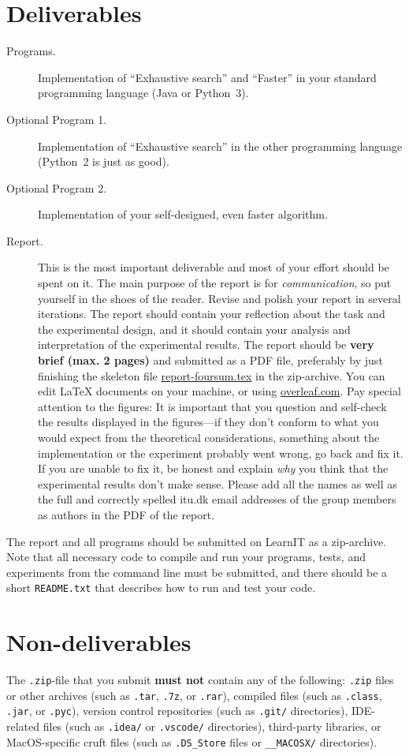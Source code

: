 \documentclass[nobib]{tufte-handout}
\begin{document}
\section{Deliverables}
\begin{description}
  \item[Programs.] Implementation of ``Exhaustive search'' and ``Faster'' in your standard programming language (Java or Python~3).
  \item[Optional Program 1.] Implementation of ``Exhaustive search''  in the other programming language (Python~2 is just as good).
  \item[Optional Program 2.] Implementation of your self-designed, even faster algorithm.
  \item[Report.]
    This is the most important deliverable and most of your effort should be spent on it. The main purpose of the report is for \emph{communication}, so put yourself in the shoes of the reader. Revise and polish your report in several iterations. The report should contain your reflection about the task and the experimental design, and it should contain your analysis and interpretation of the experimental results.
    The report should be \textbf{very brief (max. 2 pages)} and submitted as a PDF file, preferably by just finishing the skeleton file \href{https://bitbucket.org/rikj/bads-labs/src/master/foursum/docs/report-foursum.tex}{report-foursum.tex} in the zip-archive. You can edit LaTeX documents on your machine, or using \href{https://www.overleaf.com/}{overleaf.com}. Pay special attention to the figures: It is important that you question and self-check the results displayed in the figures---if they don't conform to what you would expect from the theoretical considerations, something about the implementation or the experiment probably went wrong, go back and fix it. If you are unable to fix it, be honest and explain \emph{why} you think that the experimental results don't make sense.
    Please add all the names as well as the full and correctly spelled itu.dk email addresses of the group members as authors in the PDF of the report.
\end{description}
The report and all programs should be submitted on LearnIT as a zip-archive. Note that all necessary code to compile and run your programs, tests, and experiments from the command line must be submitted, and there should be a short \texttt{README.txt} that describes how to run and test your code.

\section{Non-deliverables}
The \texttt{.zip}-file that you submit \textbf{must not} contain any of the following: \texttt{.zip} files or other archives (such as \texttt{.tar}, \texttt{.7z}, or \texttt{.rar}), compiled files (such as \texttt{.class}, \texttt{.jar}, or \texttt{.pyc}), version control repositories (such as \texttt{.git/} directories), IDE-related files (such as \texttt{.idea/} or \texttt{.vscode/} directories), third-party libraries, or MacOS-specific cruft files (such as \texttt{.DS\_Store} files or \texttt{\_\_MACOSX/} directories).
\end{document}
